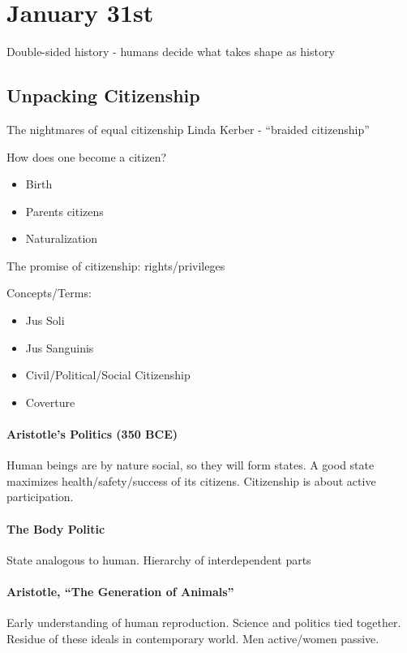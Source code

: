\section{January 31st}

Double-sided history - humans decide what takes shape as history

\subsection{Unpacking Citizenship}
The nightmares of equal citizenship
Linda Kerber - ``braided citizenship''

How does one become a citizen?
\begin{itemize}
  \item Birth
  \item Parents citizens
  \item Naturalization 
\end{itemize}

The promise of citizenship: rights/privileges

Concepts/Terms:
\begin{itemize}
  \item Jus Soli
  \item Jus Sanguinis
  \item Civil/Political/Social Citizenship
  \item Coverture
\end{itemize}

\paragraph{Aristotle's Politics (350 BCE)} Human beings are by nature social, so they will form states. A good state maximizes health/safety/success of its citizens. Citizenship is about active participation.

\paragraph{The Body Politic} State analogous to human. Hierarchy of interdependent parts 

\paragraph{Aristotle, ``The Generation of Animals''} Early understanding of human reproduction. Science and politics tied together. Residue of these ideals in contemporary world. Men active/women passive.

